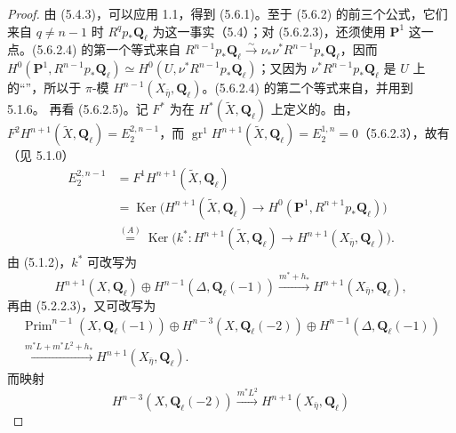 \begin{proof}
由 (5.4.3)，可以应用 1.1，得到 (5.6.1)。至于 (5.6.2) 的前三个公式，它们来自 $q\neq n-1$ 时 $R^qp_*\mathbf Q_\ell$ 为这一事实（5.4）；对 (5.6.2.3)，还须使用 $\mathbf P^1$ 这一点。(5.6.2.4) 的第一个等式来自
$R^{n-1}p_*\mathbf Q_\ell\xrightarrow{\sim}\nu_*\nu^*R^{n-1}p_*\mathbf Q_\ell$，因而
$H^0(\mathbf P^1,R^{n-1}p_*\mathbf Q_\ell)\simeq H^0(U,\nu^*R^{n-1}p_*\mathbf Q_\ell)$；又因为 $\nu^*R^{n-1}p_*\mathbf Q_\ell$ 是 $U$ 上的“”，所以于 $\pi$-模 $H^{n-1}(X_{\bar\eta},\mathbf Q_\ell)$。(5.6.2.4) 的第二个等式来自，并用到 5.1.6。
再看 (5.6.2.5)。记 $F^*$ 为在 $H^*(\widetilde X,\mathbf Q_\ell)$ 上定义的。由，
$F^2H^{n+1}(\widetilde X,\mathbf Q_\ell)=E_2^{2,n-1}$，而 $\operatorname{gr}^1H^{n+1}(\widetilde X,\mathbf Q_\ell)=E_2^{1,n}=0$（5.6.2.3），故有（见 5.1.0）
\begin{equation}\tag{5.6.3}\begin{aligned}
E_2^{2,n-1}&=F^1H^{n+1}(\widetilde X,\mathbf Q_\ell)\\
&=\operatorname{Ker}\bigl(H^{n+1}(\widetilde X,\mathbf Q_\ell)\to H^0(\mathbf P^1,R^{n+1}p_*\mathbf Q_\ell)\bigr)\\
&\overset{(A)}=\operatorname{Ker}\bigl(k^*:H^{n+1}(\widetilde X,\mathbf Q_\ell)\to H^{n+1}(X_{\bar\eta},\mathbf Q_\ell)\bigr).
\end{aligned}\end{equation}
由 (5.1.2)，$k^*$ 可改写为
\begin{equation}\tag{5.6.4}H^{n+1}(X,\mathbf Q_\ell)\oplus H^{n-1}(\Delta,\mathbf Q_\ell(-1))\xrightarrow{m^*+h_*}H^{n+1}(X_{\bar\eta},\mathbf Q_\ell),\end{equation}
再由 (5.2.2.3)，又可改写为
\begin{equation}\tag{5.6.5}\begin{gathered}
\operatorname{Prim}^{n-1}(X,\mathbf Q_\ell(-1))\oplus H^{n-3}(X,\mathbf Q_\ell(-2))\oplus H^{n-1}(\Delta,\mathbf Q_\ell(-1))\\
\xrightarrow{m^*L+m^*L^2+h_*}H^{n+1}(X_{\bar\eta},\mathbf Q_\ell).
\end{gathered}\end{equation}
而映射
\[H^{n-3}(X,\mathbf Q_\ell(-2))\xrightarrow{m^*L^2}H^{n+1}(X_{\bar\eta},\mathbf Q_\ell)\]

\end{proof}
